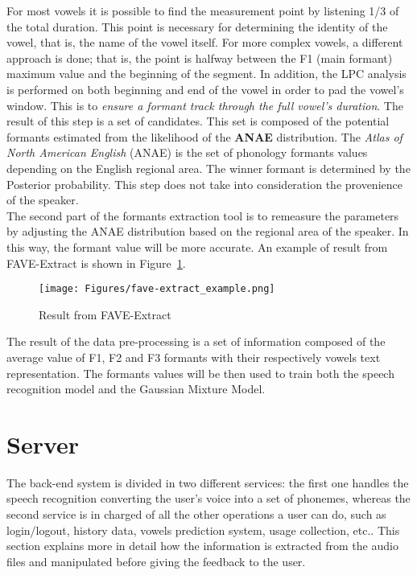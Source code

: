 \noindent For most vowels it is possible to find the measurement point by listening 1/3 of the total duration\cite{rosenfelder2011fave}. This point is necessary for determining the identity of the vowel, that is, the name of the vowel itself. For more complex vowels, a different approach is done; that is, the point is halfway between the F1 (main formant) maximum value and the beginning of the segment. In addition, the LPC analysis is performed on both beginning and end of the vowel in order to pad the vowel's window. This is to \emph{ensure a formant track through the full vowel's duration}\cite{harrison2004variability}. The result of this step is a set of candidates. This set is composed of the potential formants estimated from the likelihood of the \textbf{ANAE} distribution. The \textit{Atlas of North American English} (ANAE) is the set of phonology formants values depending on the English regional area. The winner formant is determined by the Posterior probability. This step does not take into consideration the provenience of the speaker. \\

\noindent The second part of the formants extraction tool is to remeasure the parameters by adjusting the ANAE distribution based on the regional area of the speaker. In this way, the formant value will be more accurate. An example of result from FAVE-Extract is shown in Figure~\ref{fig:fave-extract_example}.

\begin{figure}[!ht]
	\centering
	\texttt{[image: Figures/fave-extract\_example.png]}
	\caption{Result from FAVE-Extract}
	\label{fig:fave-extract_example}
\end{figure}

\noindent The result of the data pre-processing is a set of information composed of the average value of F1, F2 and F3 formants with their respectively vowels text representation. The formants values will be then used to train both the speech recognition model and the Gaussian Mixture Model.

\section{Server}
\label{sec:server}

The back-end system is divided in two different services: the first one handles the speech recognition converting the user's voice into a set of phonemes, whereas the second service is in charged of all the other operations a user can do, such as login/logout, history data, vowels prediction system, usage collection, etc.. This section explains more in detail how the information is extracted from the audio files and manipulated before giving the feedback to the user.

